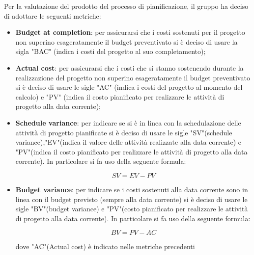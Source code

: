 Per la valutazione del prodotto del processo di pianificazione, il gruppo ha deciso di adottare le seguenti metriche:
\begin{itemize}
\item \textbf{Budget at completion}: per assicurarsi che i costi sostenuti per il progetto non superino esageratamente il budget preventivato si è deciso di usare la sigla "BAC" (indica i costi del progetto al suo completamento);
\item \textbf{Actual cost}: per assicurarsi che i costi che si stanno sostenendo durante la realizzazione del progetto non superino esageratamente il budget preventivato si è deciso di usare le sigle "AC" (indica i costi del progetto al momento del calcolo) e "PV" (indica il costo pianificato per realizzare le attività di progetto alla data corrente);
\item \textbf{Schedule variance}: per indicare se si è in linea con la schedulazione delle attività di progetto pianificate si è deciso di usare le sigle "SV"(schedule variance),"EV"(indica il valore delle attività realizzate alla data corrente) e "PV"(indica il costo pianificato per realizzare le attività di progetto alla data corrente). In particolare si fa uso della seguente formula: \vspace{-0.5cm}
\begin{center}
\[SV=EV-PV\]
\end{center}
\item \textbf{Budget variance}: per indicare se i costi sostenuti alla data corrente sono in linea con il budget previsto (sempre alla data corrente) si è deciso di usare le sigle "BV"(budget variance) e "PV"(costo pianificato per realizzare le attività di progetto alla data corrente).  In particolare si fa uso della seguente formula: \vspace{-0.5cm}
\begin{center}
\[BV=PV-AC\]
\end{center}
dove "AC"(Actual cost) è indicato nelle metriche precedenti
\end{itemize}




